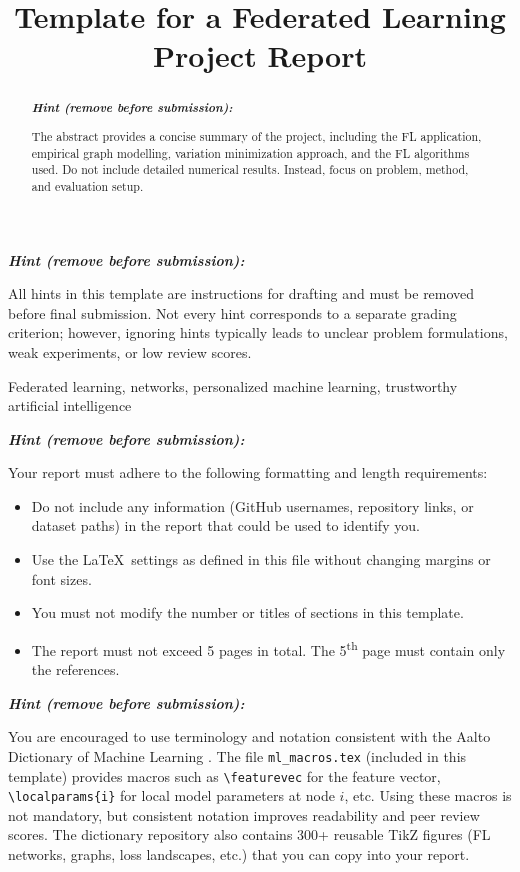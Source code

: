 \documentclass{article}
\title{Template for a Federated Learning Project Report}
\newenvironment{hint}{%
	\par\medskip\noindent
	\begin{minipage}[t]{\dimexpr\columnwidth-8mm}%
	\raggedright\itshape
	\textbf{Hint (remove before submission):}\space
}{%
	\end{minipage}\par\medskip
}
\begin{document}
\maketitle

\begin{hint}
	All hints in this template are instructions for drafting and must be
	removed before final submission. Not every hint corresponds to a
	separate grading criterion; however, ignoring hints typically leads to unclear
	problem formulations, weak experiments, or low review scores.
\end{hint}

\begin{abstract}
	\begin{hint}
The abstract provides a concise summary of the project, including the FL application,
empirical graph modelling, variation minimization approach, and the FL algorithms used.
Do not include detailed numerical results. Instead, focus on problem, method, and evaluation setup.
	\end{hint}
\end{abstract}

\begin{keywords}
Federated learning, networks, personalized machine learning, trustworthy artificial intelligence
\end{keywords}

\begin{hint}
	Your report must adhere to the following formatting and length requirements:
\begin{itemize}
	\item Do not include any information (GitHub usernames, repository links, or dataset paths)
	           in the report that could be used to identify you.
	\item Use the \LaTeX\ settings as defined in this file without changing margins or font sizes.
	\item You must not modify the number or titles of sections in this template.
	\item The report must not exceed 5 pages in total. The 5\textsuperscript{th} page must
	contain only the references.
\end{itemize}
\end{hint}

\begin{hint}
You are encouraged to use terminology and notation consistent with the
Aalto Dictionary of Machine Learning \cite{AaltoDictML}.
The file \texttt{ml\_macros.tex} (included in this template) provides
macros such as \texttt{\textbackslash featurevec} for the feature vector,
\texttt{\textbackslash localparams\{i\}} for local model parameters at node $i$, etc.
Using these macros is not mandatory, but consistent notation
improves readability and peer review scores.
The dictionary repository also contains 300+ reusable TikZ figures
(FL networks, graphs, loss landscapes, etc.) that you can copy into your report.
\end{hint}
\end{document}

